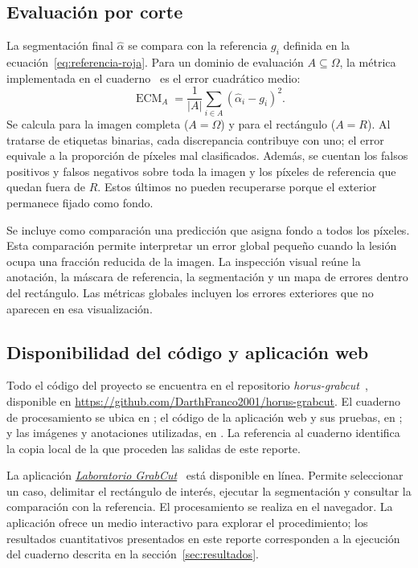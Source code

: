 \subsection{Evaluación por corte}

La segmentación final $\widehat\alpha$ se compara con la referencia $g_i$
definida en la ecuación~\eqref{eq:referencia-roja}. Para un dominio de
evaluación $A\subseteq\Omega$, la métrica implementada en el
cuaderno~\cite{cuaderno} es el error cuadrático medio:
\begin{equation}
 \operatorname{ECM}_A=\frac{1}{|A|}
 \sum_{i\in A}(\widehat\alpha_i-g_i)^2.
 \label{eq:ecm}
\end{equation}
Se calcula para la imagen completa ($A=\Omega$) y para el rectángulo
($A=R$). Al tratarse de etiquetas binarias, cada discrepancia contribuye
con uno; el error equivale a la proporción de píxeles mal clasificados.
Además, se cuentan los falsos positivos y falsos negativos sobre toda la
imagen y los píxeles de referencia que quedan fuera de $R$. Estos últimos
no pueden recuperarse porque el exterior permanece fijado como fondo.

Se incluye como comparación una predicción que asigna fondo a todos los
píxeles. Esta comparación permite interpretar un error global pequeño
cuando la lesión ocupa una fracción reducida de la imagen. La inspección
visual reúne la anotación, la máscara de referencia, la segmentación y un
mapa de errores dentro del rectángulo. Las métricas globales incluyen los
errores exteriores que no aparecen en esa visualización.

\subsection{Disponibilidad del código y aplicación web}
\label{sec:disponibilidad}

Todo el código del proyecto se encuentra en el repositorio
\textit{horus-grabcut}~\cite{repositorio}, disponible en
\url{https://github.com/DarthFranco2001/horus-grabcut}.
El cuaderno de procesamiento se ubica en ; el código de
la aplicación web y sus pruebas, en ; y las imágenes y
anotaciones utilizadas, en . La referencia al cuaderno
identifica la copia local de la que proceden las salidas de este reporte.

La aplicación \href{https://darthfranco2001.github.io/horus-grabcut/}{\textit{Laboratorio GrabCut}}~\cite{web} está disponible en línea.
Permite seleccionar un caso, delimitar el rectángulo de interés, ejecutar
la segmentación y consultar la comparación con la referencia. El
procesamiento se realiza en el navegador. La aplicación ofrece un medio
interactivo para explorar el procedimiento; los resultados cuantitativos
presentados en este reporte corresponden a la ejecución del cuaderno
descrita en la sección~\ref{sec:resultados}.
